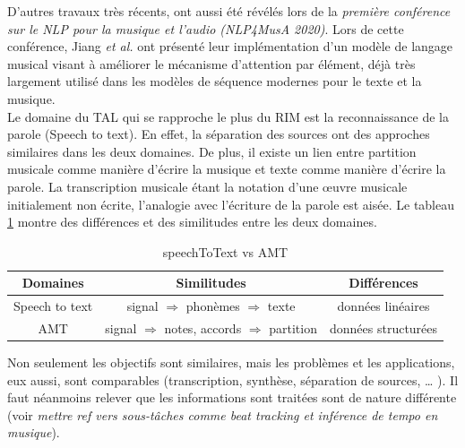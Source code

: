 
D’autres travaux
très récents, ont aussi été révélés lors de la \textit{première conférence sur
le NLP pour la musique et l’audio (NLP4MusA 2020)}. Lors de cette conférence,
Jiang \textit{et al.} \cite{Jiang2020DiscoveringMR} ont présenté leur
implémentation d’un modèle de langage musical visant à améliorer le mécanisme
d’attention par élément, déjà très largement utilisé dans les modèles de
séquence modernes pour le texte et la musique.\\
Le domaine du TAL qui se rapproche le plus du RIM est la reconnaissance de la
parole (Speech to text). En effet, la séparation des sources ont des approches
similaires dans les deux domaines. De plus, il existe un lien entre partition
musicale comme manière d’écrire la musique et texte comme manière d’écrire la
parole. La transcription musicale étant la notation d’une œuvre musicale
initialement non écrite, l’analogie avec l’écriture de la parole est aisée. Le
tableau \ref{spToTxt_vs_TAM} montre des différences et des similitudes entre
les deux domaines.

\begin{table}[h]
	\centering
	\begin{tabular}{|c|c|c|} \hline
	Domaines & Similitudes & Différences \\ \hline
	Speech to text & signal $\Rightarrow$ phonèmes $\Rightarrow$
    texte & données linéaires\\
	AMT & signal $\Rightarrow$ notes, accords $\Rightarrow$ partition & données
    structurées\\ \hline
	\end{tabular}
	\caption{speechToText vs AMT}
	\label{spToTxt_vs_TAM}
\end{table}
Non seulement les objectifs sont similaires, mais les problèmes et les
applications, eux aussi, sont comparables (transcription, synthèse, séparation
de sources, … ). Il faut néanmoins relever que les informations sont traitées
sont de nature différente (voir \textit{mettre ref vers sous-tâches comme beat
tracking et inférence de tempo en musique}).

